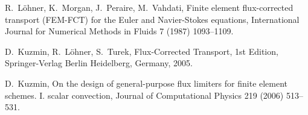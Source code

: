\documentclass[xchauthor,chkrefs,fixeqskip,GCNS,amsmath,amsthm]{yjcphg}
\theoremstyle{remark}
\begin{document}
\begin{backmatter}
\begin{thebibliography}{}
\begin{bsubitem}
\begin{bcontribution}%
\end{bcontribution}
\begin{bhost}
\begin{bissue}
\end{bissue}
\end{bhost}
\end{bsubitem}
%
\OrigBibText
R.~L\"ohner, K.~Morgan, J.~Peraire, M.~Vahdati, Finite element
flux-corrected transport (FEM-{FCT}) for the {E}uler and
{N}avier-{S}tokes equations, International Journal for Numerical Methods
in Fluids 7 (1987) 1093--1109.
\endOrigBibText
{}%
\endbibitem

\begin{bsubitem}
\begin{bcontribution}%
\end{bcontribution}
\begin{bhost}
\begin{bbook}
\end{bbook}
\end{bhost}
\end{bsubitem}
%
\OrigBibText
D.~Kuzmin, R.~L\"ohner, S.~Turek, Flux-Corrected Transport, 1st
Edition, Springer-Verlag Berlin Heidelberg, Germany, 2005.
\endOrigBibText
{}%
\endbibitem

\begin{bsubitem}
\begin{bcontribution}%
\end{bcontribution}
\begin{bhost}
\begin{bissue}
\end{bissue}
\end{bhost}
\end{bsubitem}
%
\OrigBibText
D.~Kuzmin, On the design of general-purpose flux limiters for finite
element schemes. I. scalar convection, Journal of Computational
Physics 219 (2006) 513--531.
\endOrigBibText
{}%
\endbibitem


\end{thebibliography}
\end{backmatter}
\end{document}
